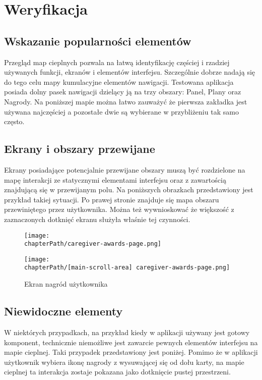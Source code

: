 \section{Weryfikacja}

\subsection{Wskazanie popularności elementów}
Przegląd map cieplnych pozwala na łatwą identyfikację częściej i rzadziej używanych funkcji, ekranów i elementów interfejsu. Szczególnie dobrze nadają się do tego celu mapy kumulacyjne elementów nawigacji. Testowana aplikacja posiada dolny pasek nawigacji dzielący ją na trzy obszary: Panel, Plany oraz Nagrody. Na poniższej mapie można łatwo zauważyć że pierwsza zakładka jest używana najczęściej a pozostałe dwie są wybierane w przybliżeniu tak samo często.

\bigskip
{}

\subsection{Ekrany i obszary przewijane}
Ekrany posiadające potencjalnie przewijane obszary muszą być rozdzielone na mapę interakcji ze statycznymi elementami interfejsu oraz z zawartością znajdującą się w przewijanym polu. Na poniższych obrazkach przedstawiony jest przykład takiej sytuacji. Po prawej stronie znajduje się mapa obszaru przewiniętego przez użytkownika. Można też wywnioskować że większość z zaznaczonych dotknięć ekranu służyła właśnie tej czynności. 

\bigskip
\begin{figure}[H]
\centering
\begin{minipage}{.35\textwidth}
	\centering
	\texttt{[image: \\chapterPath/caregiver-awards-page.png]}
\end{minipage}
\begin{minipage}{.3\textwidth}
	\centering
	\texttt{[image: \\chapterPath/[main-scroll-area] caregiver-awards-page.png]}
\end{minipage}
\bigskip
\caption{Ekran nagród użytkownika}
\label{fig:rs_panel_parts}
\end{figure}

\subsection{Niewidoczne elementy}
W niektórych przypadkach, na przykład kiedy w aplikacji używany jest gotowy komponent, technicznie niemożliwe jest zawarcie pewnych elementów interfejsu na mapie cieplnej. Taki przypadek przedstawiony jest poniżej. Pomimo że w aplikacji użytkownik wybiera ikonę nagrody z wysuwającej się od dołu karty, na mapie cieplnej ta interakcja zostaje pokazana jako dotknięcie pustej przestrzeni.

